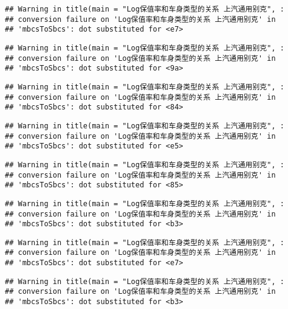 \documentclass[]{article}
\begin{document}
\begin{verbatim}
## Warning in title(main = "Log保值率和车身类型的关系 上汽通用别克", :
## conversion failure on 'Log保值率和车身类型的关系 上汽通用别克' in
## 'mbcsToSbcs': dot substituted for <e7>
\end{verbatim}

\begin{verbatim}
## Warning in title(main = "Log保值率和车身类型的关系 上汽通用别克", :
## conversion failure on 'Log保值率和车身类型的关系 上汽通用别克' in
## 'mbcsToSbcs': dot substituted for <9a>
\end{verbatim}

\begin{verbatim}
## Warning in title(main = "Log保值率和车身类型的关系 上汽通用别克", :
## conversion failure on 'Log保值率和车身类型的关系 上汽通用别克' in
## 'mbcsToSbcs': dot substituted for <84>
\end{verbatim}

\begin{verbatim}
## Warning in title(main = "Log保值率和车身类型的关系 上汽通用别克", :
## conversion failure on 'Log保值率和车身类型的关系 上汽通用别克' in
## 'mbcsToSbcs': dot substituted for <e5>
\end{verbatim}

\begin{verbatim}
## Warning in title(main = "Log保值率和车身类型的关系 上汽通用别克", :
## conversion failure on 'Log保值率和车身类型的关系 上汽通用别克' in
## 'mbcsToSbcs': dot substituted for <85>
\end{verbatim}

\begin{verbatim}
## Warning in title(main = "Log保值率和车身类型的关系 上汽通用别克", :
## conversion failure on 'Log保值率和车身类型的关系 上汽通用别克' in
## 'mbcsToSbcs': dot substituted for <b3>
\end{verbatim}

\begin{verbatim}
## Warning in title(main = "Log保值率和车身类型的关系 上汽通用别克", :
## conversion failure on 'Log保值率和车身类型的关系 上汽通用别克' in
## 'mbcsToSbcs': dot substituted for <e7>
\end{verbatim}

\begin{verbatim}
## Warning in title(main = "Log保值率和车身类型的关系 上汽通用别克", :
## conversion failure on 'Log保值率和车身类型的关系 上汽通用别克' in
## 'mbcsToSbcs': dot substituted for <b3>
\end{verbatim}
\end{document}
